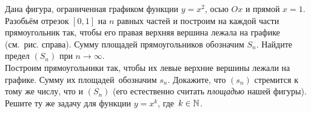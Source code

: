 \documentclass[a4paper, 12pt]{article}
\begin{document}
Дана фигура, ограниченная графиком
функции $y=x^2$, осью $Ox$ и прямой $x=1$. Разобь\"ем
отрезок $[0,1]$ на $n$ равных частей и построим на каждой
части прямоугольник так, чтобы его правая верхняя вершина
лежала на графике (см.~рис. справа).
Сумму
площадей прямоугольников обозначим $S_n$.
Найдите предел $(S_n)$ при $n \to \infty$.\\
 Построим прямоугольники так, чтобы
их левые верхние вершины лежали на графике. %
Сумму их площадей~обозначим $s_n$. Докажите,
что %
$(s_n)$ стре\-мит\-ся к тому же числу,
что и $(S_n)$ (его естественно считать \textit{площадью}
нашей фигуры).\\
 Решите ту же задачу для функции $y=x^k$, где~\hbox{$k\in\mathbb{N}$.}





%
%
%











\end{document}
